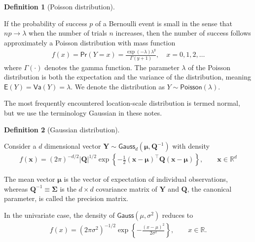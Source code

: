 \documentclass[
  11pt,
  letterpaper,
]{scrbook}
\theoremstyle{definition}
\theoremstyle{definition}
\theoremstyle{definition}
\newtheorem{definition}{Definition}[chapter]
\theoremstyle{plain}
\theoremstyle{plain}
\theoremstyle{remark}
\begin{document}
\begin{definition}[Poisson
distribution]\protect\hypertarget{def-poissondist}{}\label{def-poissondist}

If the probability of success \(p\) of a Bernoulli event is small in the
sense that \(np \to \lambda\) when the number of trials \(n\) increases,
then the number of success follows approximately a Poisson distribution
with mass function \begin{align*}
f(x)=\mathsf{Pr}(Y=x) = \frac{\exp(-\lambda)\lambda^y}{\Gamma(y+1)}, \quad x=0, 1, 2, \ldots
\end{align*} where \(\Gamma(\cdot)\) denotes the gamma function. The
parameter \(\lambda\) of the Poisson distribution is both the
expectation and the variance of the distribution, meaning
\(\mathsf{E}(Y)=\mathsf{Va}(Y)=\lambda.\) We denote the distribution as
\(Y \sim \mathsf{Poisson}(\lambda)\).

\end{definition}

The most frequently encountered location-scale distribution is termed
normal, but we use the terminology Gaussian in these notes.

\begin{definition}[Gaussian
distribution]\protect\hypertarget{def-gaussian}{}\label{def-gaussian}

Consider a \(d\) dimensional vector
\(\boldsymbol{Y} \sim \mathsf{Gauss}_d(\boldsymbol{\mu}, \boldsymbol{Q}^{-1})\)
with density \begin{align*}
f(\boldsymbol{x}) = (2\pi)^{-d/2} |\boldsymbol{Q}|^{1/2} \exp \left\{ - \frac{1}{2} (\boldsymbol{x}-\boldsymbol{\mu})^\top \boldsymbol{Q}(\boldsymbol{x}-\boldsymbol{\mu})\right\}, \qquad \boldsymbol{x} \in \mathbb{R}^d
\end{align*}

The mean vector \(\boldsymbol{\mu}\) is the vector of expectation of
individual observations, whereas
\(\boldsymbol{Q}^{-1}\equiv \boldsymbol{\Sigma}\) is the \(d \times d\)
covariance matrix of \(\boldsymbol{Y}\) and \(\boldsymbol{Q}\), the
canonical parameter, is called the precision matrix.

In the univariate case, the density of \(\mathsf{Gauss}(\mu, \sigma^2)\)
reduces to \begin{align*}
f(x) = (2\pi\sigma^2)^{-1/2} \exp \left\{ - \frac{(x-\mu)^2}{2\sigma^2}\right\}, \qquad x \in \mathbb{R}.
\end{align*}

\end{definition}
\end{document}
